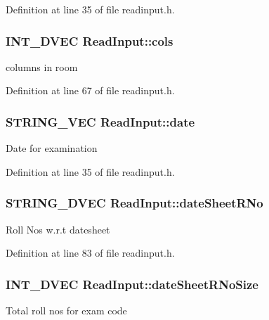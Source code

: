 \-Definition at line 35 of file readinput.\-h.

\hypertarget{classReadInput_ac717fe1f94a77db9fb20161e00043a9d}{
\subsubsection[{cols}]{\setlength{\rightskip}{0pt plus 5cm}\-I\-N\-T\-\_\-D\-V\-E\-C {\bf \-Read\-Input\-::cols}}}\label{de/d50/classReadInput_ac717fe1f94a77db9fb20161e00043a9d}
columns in room 

\-Definition at line 67 of file readinput.\-h.

\hypertarget{classReadInput_a3e8d6a0fef698a51e38fc06be401c390}{
\subsubsection[{date}]{\setlength{\rightskip}{0pt plus 5cm}\-S\-T\-R\-I\-N\-G\-\_\-\-V\-E\-C {\bf \-Read\-Input\-::date}}}\label{de/d50/classReadInput_a3e8d6a0fef698a51e38fc06be401c390}
\-Date for examination 

\-Definition at line 35 of file readinput.\-h.

\hypertarget{classReadInput_ab3a09915476fba776592d85dff52187d}{
\subsubsection[{date\-Sheet\-R\-No}]{\setlength{\rightskip}{0pt plus 5cm}\-S\-T\-R\-I\-N\-G\-\_\-D\-V\-E\-C {\bf \-Read\-Input\-::date\-Sheet\-R\-No}}}\label{de/d50/classReadInput_ab3a09915476fba776592d85dff52187d}
\-Roll \-Nos w.\-r.\-t datesheet 

\-Definition at line 83 of file readinput.\-h.

\hypertarget{classReadInput_aa56be8b352098aff43c904982b3bc2b8}{
\subsubsection[{date\-Sheet\-R\-No\-Size}]{\setlength{\rightskip}{0pt plus 5cm}\-I\-N\-T\-\_\-D\-V\-E\-C {\bf \-Read\-Input\-::date\-Sheet\-R\-No\-Size}}}\label{de/d50/classReadInput_aa56be8b352098aff43c904982b3bc2b8}
\-Total roll nos for exam code 

